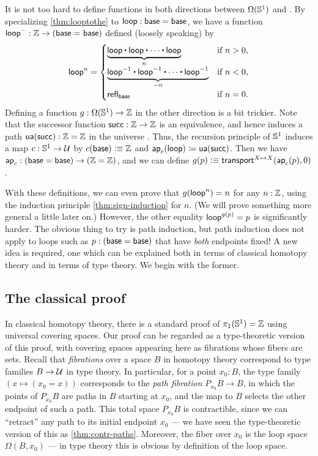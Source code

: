 It is not too hard to define functions in both directions between $\Omega(\mathbb{S}^1)$ and \Z.
By specializing \autoref{thm:looptothe} to $\mathsf{loop}:\mathsf{base}=\mathsf{base}$, we have a function $\mathsf{loop}^{\mathord{\hspace{1pt}\text{--}\hspace{1pt}}} : \mathbb{Z} \rightarrow (\mathsf{base} =_{} \mathsf{base})$ defined (loosely speaking) by
\[
  \lloop^n =
  \begin{cases}
    \underbrace{\lloop \ct \lloop \ct \cdots \ct \lloop}_{n}  & \text{if $n > 0$,} \\
    \underbrace{\opp \lloop \ct \opp \lloop \ct \cdots \ct \opp \lloop}_{-n} & \text{if $n < 0$,} \\
    \refl{\base} & \text{if $n = 0$.}
\end{cases}
\]
%
Defining a function $g:\Omega(\mathbb{S}^1)\to\mathbb{Z}$ in the other direction is a bit trickier.
Note that the successor function $\mathsf{succ}:\mathbb{Z}\to\mathbb{Z}$ is an equivalence,
%
and hence induces a path $\mathsf{ua}(\mathsf{succ}):\mathbb{Z}=\mathbb{Z}$ in the universe \type.
Thus, the recursion principle of $\mathbb{S}^1$ induces a map $c:\mathbb{S}^1\to\mathcal{U}$ by $c(\mathsf{base})\vcentcolon\equiv \mathbb{Z}$ and $\mathsf{ap}_{c} (\mathsf{loop}) \coloneqq \mathsf{ua}(\mathsf{succ})$.
Then we have $\mathsf{ap}_{c} : (\mathsf{base}=\mathsf{base}) \to (\mathbb{Z}=\mathbb{Z})$, and we can define $g(p)\vcentcolon\equiv \mathsf{transport}^{X\mapsto X}(\mathsf{ap}_{c}(p),0)$.

With these definitions, we can even prove that $g(\mathsf{loop}^n)=n$ for any $n:\mathbb{Z}$, using the induction principle \autoref{thm:sign-induction} for $n$.
(We will prove something more general a little later on.)
However, the other equality $\mathsf{loop}^{g(p)}=p$ is significantly harder.
The obvious thing to try is path induction, but path induction does not apply to loops such as $p:(\mathsf{base}=\mathsf{base})$ that have \emph{both} endpoints fixed!
A new idea is required, one which can be explained both in terms of classical homotopy theory and in terms of type theory.
We begin with the former.


\subsection{The classical proof}
\label{sec:pi1s1-classical-proof}

%
In classical homotopy theory, there is a standard proof of $\pi_1(\mathbb{S}^1)=\mathbb{Z}$ using universal covering spaces.
Our proof can be regarded as a type-theoretic version of this proof, with covering spaces appearing here as fibrations whose fibers are sets.
%
%
Recall that \emph{fibrations} over a space $B$ in homotopy theory correspond to type families $B\to\mathcal{U}$ in type theory.
%
%
In particular, for a point $x_0:B$, the type family $(x\mapsto (x_0=x))$ corresponds to the \emph{path fibration} $P_{x_0} B \to B$, in which the points of $P_{x_0} B$ are paths in $B$ starting at $x_0$, and the map to $B$ selects the other endpoint of such a path.
This total space $P_{x_0} B$ is contractible, since we can ``retract'' any path to its initial endpoint $x_0$ --- we have seen the type-theoretic version of this as \autoref{thm:contr-paths}.
Moreover, the fiber over $x_0$ is the loop space $\Omega(B,x_0)$ --- in type theory this is obvious by definition of the loop space.

